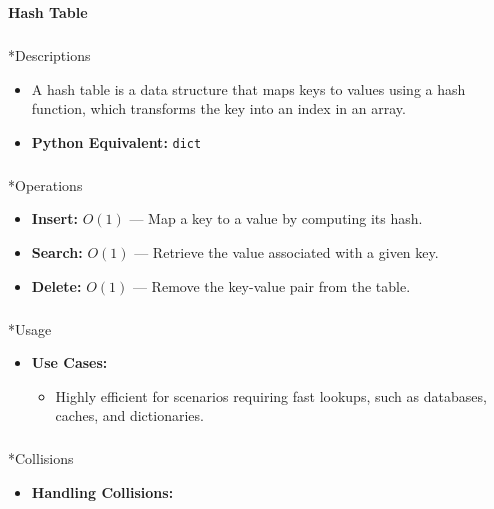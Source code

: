 \documentclass[
  letterpaper,
  DIV=11,
  numbers=noendperiod]{scrreprt}
\makeatletter
\let\oldsubparagraph\subparagraph
\renewcommand{\subparagraph}{
    \@ifstar
      \xxxSubParagraphStar
      \xxxSubParagraphNoStar
  }
\newcommand{\xxxSubParagraphStar}[1]{\oldsubparagraph*{#1}\mbox{}}
\newcommand{\xxxSubParagraphNoStar}[1]{\oldsubparagraph{#1}\mbox{}}
\providecommand{\tightlist}{%
  \setlength{\itemsep}{0pt}\setlength{\parskip}{0pt}}
\makeatother
\begin{document}
\begin{tcolorbox}[enhanced jigsaw, colframe=quarto-callout-note-color-frame, toprule=.15mm, bottomrule=.15mm, rightrule=.15mm, colback=white, breakable, arc=.35mm, opacityback=0, left=2mm, leftrule=.75mm]

\vspace{-3mm}\textbf{Hash Table}\vspace{3mm}

\subparagraph*{Descriptions}\label{descriptions}

\begin{itemize}
\tightlist
\item
  A hash table is a data structure that maps keys to values using a hash
  function, which transforms the key into an index in an array.
\item
  \textbf{Python Equivalent:} \texttt{dict}
\end{itemize}

\subparagraph*{Operations}\label{operations-6}

\begin{itemize}
\tightlist
\item
  \textbf{Insert:} \(O(1)\) --- Map a key to a value by computing its
  hash.
\item
  \textbf{Search:} \(O(1)\) --- Retrieve the value associated with a
  given key.
\item
  \textbf{Delete:} \(O(1)\) --- Remove the key-value pair from the
  table.
\end{itemize}

\subparagraph*{Usage}\label{usage-22}

\begin{itemize}
\item
  \textbf{Use Cases:}

  \begin{itemize}
  \tightlist
  \item
    Highly efficient for scenarios requiring fast lookups, such as
    databases, caches, and dictionaries.
  \end{itemize}
\end{itemize}

\subparagraph*{Collisions}\label{collisions}

\begin{itemize}
\item
  \textbf{Handling Collisions:}


\end{itemize}
\end{tcolorbox}
\end{document}
